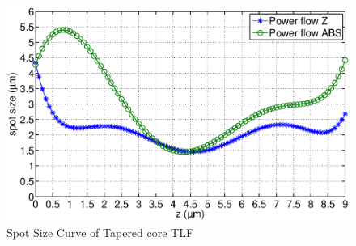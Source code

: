 \begin{figure}[!ht]
		\centering
		\includegraphics[width=0.7 \textwidth]{bilder/Tapered_core_spot_curve}
		\caption{Spot Size Curve of Tapered core TLF}
 		\label{fig:Tapered_core_spot_curve}	
\end{figure}

